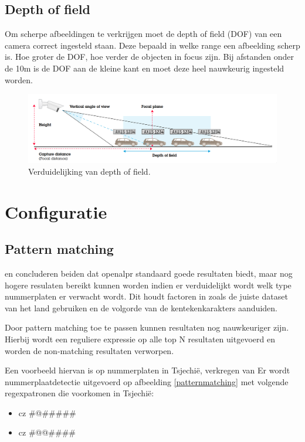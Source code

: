 \subsection{Depth of field}
Om scherpe afbeeldingen te verkrijgen moet de depth of field (DOF) van een camera correct ingesteld staan. Deze bepaald in welke range een afbeelding scherp is. Hoe groter de DOF, hoe verder de objecten in focus zijn. Bij afstanden onder de 10m is de DOF aan de kleine kant en moet deze heel nauwkeurig ingesteld worden. \autocite{axis2019license}

\begin{figure}[h!]
	\centering
	\includegraphics[width=\linewidth]{img/depth-of-field.png}
	\caption{Verduidelijking van depth of field. \autocite{axis2019license}}
\end{figure}


\section{Configuratie}

\subsection{Pattern matching}
\textcite{arrieta2019prototype} en \textcite{buhus2016automatic} concluderen beiden dat openalpr standaard goede resultaten biedt, maar nog hogere resulaten bereikt kunnen worden indien er verduidelijkt wordt welk type nummerplaten er verwacht wordt. Dit houdt factoren in zoals de juiste dataset van het land gebruiken en de volgorde van de kentekenkarakters aanduiden.

Door pattern matching toe te passen kunnen resultaten nog nauwkeuriger zijn. Hierbij wordt een reguliere expressie op alle top N resultaten uitgevoerd en worden de non-matching resultaten verworpen.

Een voorbeeld hiervan is op nummerplaten in Tsjechië, verkregen van \textcite{openalpr2015pattern}
Er wordt nummerplaatdetectie uitgevoerd op afbeelding \ref{patternmatching} met volgende regexpatronen die voorkomen in Tsjechië:
\begin{itemize}
	\item cz \#@\#\#\#\#\#
	\item cz \#@@\#\#\#\#
\end{itemize}

